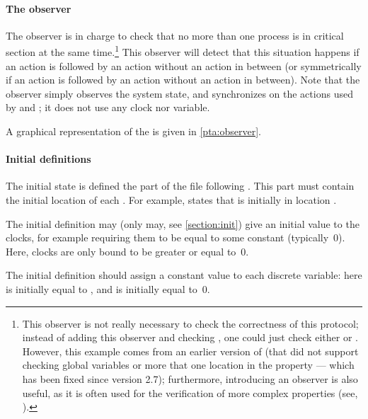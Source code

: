 \paragraph{The observer}
The observer is in charge to check that no more than one process is in critical section at the same time.\footnote{%
	This observer is not really necessary to check the correctness of this protocol;
	instead of adding this observer and checking , one could just check either  or .
	However, this example comes from an earlier version of \imitator{} (that did not support checking global variables or more that one location in the  property --- which has been fixed since version 2.7); furthermore, introducing an observer is also useful, as it is often used for the verification of more complex properties (see, \eg{} \cite{ABL98,ABBL98}).
}
This observer will detect that this situation happens if an action  is followed by an action  without an action  in between (or symmetrically if an action  is followed by an action  without an action  in between).
Note that the observer simply observes the system state, and synchronizes on the actions used by  and ; it does not use any clock nor variable.

A graphical representation of the \IPTA{}  is given in \cref{pta:observer}.


\paragraph{Initial definitions}
The initial state is defined the part of the file following .
This part must contain the initial location of each \IPTA{}.
For example,  states that  is initially in location .

The initial definition may (only may, see \cref{section:init}) give an initial value to the clocks, for example requiring them to be equal to some constant (typically~0).
Here, clocks are only bound to be greater or equal to~0.

The initial definition should assign a constant value to each discrete variable:
here  is initially equal to , and  is initially equal to~0.

